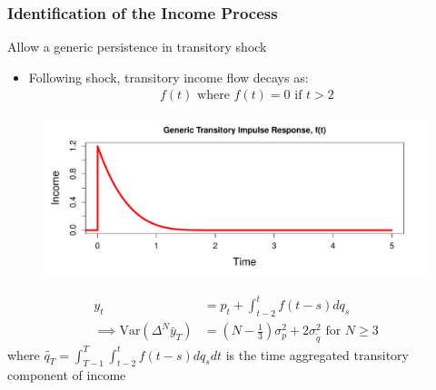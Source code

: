 \documentclass{beamer}
\begin{document}
\frame
{
	\frametitle{Identification of the Income Process}
	Allow a generic persistence in transitory shock
	\begin{itemize}
		\item Following shock, transitory income flow decays as:
		\begin{align*}
			f(t)  \text{ where } f(t)=0 \text{ if } t>2
		\end{align*}
	\end{itemize}
	\vspace*{-0.15in}
	\begin{figure}
		\includegraphics[scale=0.3]{../Figures/GenericTransitory.pdf}
	\end{figure}
	\vspace*{-0.15in}
	\begin{align*}
	y_t &= p_t + \int_{t-2}^{t} f(t-s)dq_s\\
	\implies \mathrm{Var}(\Delta^N \bar{y}_T) &= (N-\frac{1}{3})\sigma^2_p +  2 \sigma^2_{\tilde{q}} \text{   for }N \geq 3
	\end{align*}	
	where $	\tilde{q_T} = \int_{T-1}^{T}\int_{t-2}^{t} f(t-s)dq_s dt$ is the time aggregated transitory component of income
}
\frame
\end{document}
